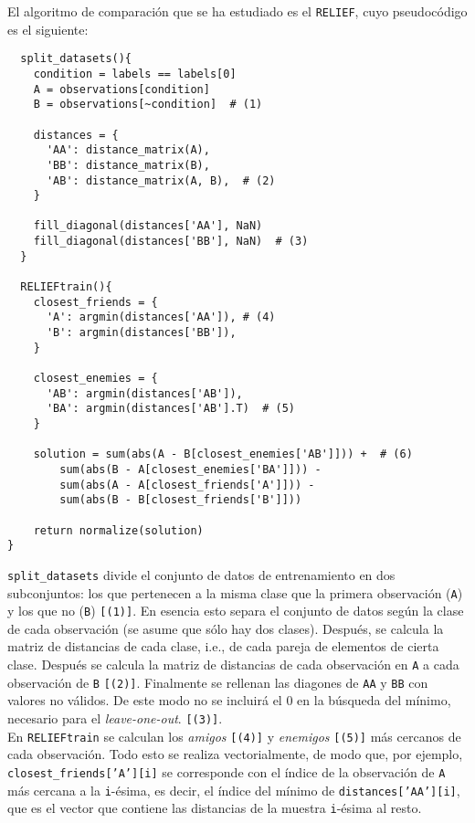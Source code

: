 \documentclass[11pt]{article}
\theoremstyle{plain}
\theoremstyle{definition}
\begin{document}
El algoritmo de comparación que se ha estudiado es el \texttt{RELIEF}, cuyo pseudocódigo es el siguiente:

\begin{lstlisting}
  split_datasets(){
    condition = labels == labels[0]
    A = observations[condition]
    B = observations[~condition]  # (1)

    distances = {
      'AA': distance_matrix(A),
      'BB': distance_matrix(B),
      'AB': distance_matrix(A, B),  # (2)
    }

    fill_diagonal(distances['AA'], NaN)
    fill_diagonal(distances['BB'], NaN)  # (3)
  }

  RELIEFtrain(){
    closest_friends = {
      'A': argmin(distances['AA']), # (4)
      'B': argmin(distances['BB']),
    }

    closest_enemies = {
      'AB': argmin(distances['AB']),
      'BA': argmin(distances['AB'].T)  # (5)
    }

    solution = sum(abs(A - B[closest_enemies['AB']])) +  # (6)
        sum(abs(B - A[closest_enemies['BA']])) -
        sum(abs(A - A[closest_friends['A']])) -
        sum(abs(B - B[closest_friends['B']]))

    return normalize(solution)
}
\end{lstlisting}

\texttt{split\_datasets} divide el conjunto de datos de entrenamiento en dos subconjuntos: los que pertenecen a la misma clase que la primera observación (\texttt{A}) y los que no (\texttt{B}) \texttt{[(1)]}. En esencia esto separa el conjunto de datos según la clase de cada observación (se asume que sólo hay dos clases). Después, se calcula la matriz de distancias de cada clase, i.e., de cada pareja de elementos de cierta clase. Después se calcula la matriz de distancias de cada observación en \texttt{A} a cada observación de \texttt{B} \texttt{[(2)]}. Finalmente se rellenan las diagones de \texttt{AA} y \texttt{BB} con valores no válidos. De este modo no se incluirá el 0 en la búsqueda del mínimo, necesario para el \textit{leave-one-out}. \texttt{[(3)]}. \\

En \texttt{RELIEFtrain} se calculan los \textit{amigos} \texttt{[(4)]} y \textit{enemigos} \texttt{[(5)]} más cercanos de cada observación. Todo esto se realiza vectorialmente, de modo que, por ejemplo, \texttt{closest\_friends['A'][i]} se corresponde con el índice de la observación de \texttt{A} más cercana a la \texttt{i}-ésima, es decir, el índice del mínimo de \texttt{distances['AA'][i]}, que es el vector que contiene las distancias de la muestra \texttt{i}-ésima al resto. \\
\end{document}
